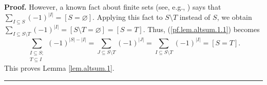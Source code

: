 \documentclass[numbers=enddot,12pt,final,onecolumn,notitlepage]{scrartcl}%
\theoremstyle{definition}
\newenvironment{proof}[1][Proof]{\noindent\textbf{#1.} }{\ \rule{0.5em}{0.5em}}
\let\sumnonlimits\sum
\renewcommand{\sum}{\sumnonlimits\limits}
\newenvironment{vershort}{}{}
\begin{document}
\begin{vershort}
\begin{proof}
However, a known fact about finite sets (see, e.g., \cite[Proposition
2.9.10]{Grinbe20}) says that $\sum_{I\subseteq S}\left(  -1\right)
^{\left\vert I\right\vert }=\left[  S=\varnothing\right]  $. Applying this
fact to $S\setminus T$ instead of $S$, we obtain $\sum_{I\subseteq S\setminus
T}\left(  -1\right)  ^{\left\vert I\right\vert }=\left[  S\setminus
T=\varnothing\right]  =\left[  S=T\right]  $. Thus, (\ref{pf.lem.altsum.1.1})
becomes%
\[
\sum_{\substack{I\subseteq S;\\T\subseteq I}}\left(  -1\right)  ^{\left\vert
S\right\vert -\left\vert I\right\vert }=\sum_{J\subseteq S\setminus T}\left(
-1\right)  ^{\left\vert J\right\vert }=\sum_{I\subseteq S\setminus T}\left(
-1\right)  ^{\left\vert I\right\vert }=\left[  S=T\right]  .
\]
This proves Lemma \ref{lem.altsum.1}.
\end{proof}
\end{vershort}
\end{document}

